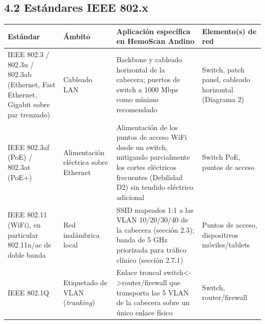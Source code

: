 \documentclass[11pt,a4paper]{article}
\begin{document}
\subsection{4.2 Estándares IEEE 802.x}\label{estuxe1ndares-ieee-802.x}

{\small
\begin{longtable}[]{@{}
  >{\raggedright\arraybackslash}p{}
  >{\raggedright\arraybackslash}p{}
  >{\raggedright\arraybackslash}p{}
  >{\raggedright\arraybackslash}p{}@{}}
\toprule\noalign{}
\begin{minipage}[b]{\linewidth}\raggedright
Estándar
\end{minipage} & \begin{minipage}[b]{\linewidth}\raggedright
Ámbito
\end{minipage} & \begin{minipage}[b]{\linewidth}\raggedright
Aplicación específica en HemoScan Andino
\end{minipage} & \begin{minipage}[b]{\linewidth}\raggedright
Elemento(s) de red
\end{minipage} \\
\midrule\noalign{}
\endhead
\bottomrule\noalign{}
\endlastfoot
IEEE 802.3 / 802.3u / 802.3ab (Ethernet, Fast Ethernet, Gigabit sobre par trenzado) & Cableado LAN & Backbone y cableado horizontal de la cabecera; puertos de switch a 1000 Mbps como mínimo recomendado & Switch, patch panel, cableado horizontal (Diagrama 2) \\
IEEE 802.3af (PoE) / 802.3at (PoE+) & Alimentación eléctrica sobre Ethernet & Alimentación de los puntos de acceso WiFi desde un switch, mitigando parcialmente los cortes eléctricos frecuentes (Debilidad D2) sin tendido eléctrico adicional & Switch PoE, puntos de acceso \\
IEEE 802.11 (WiFi), en particular 802.11n/ac de doble banda & Red inalámbrica local & SSID mapeados 1:1 a las VLAN 10/20/30/40 de la cabecera (sección 2.3); banda de 5 GHz priorizada para tráfico clínico (sección 2.7.1) & Puntos de acceso, dispositivos móviles/tablets \\
IEEE 802.1Q & Etiquetado de VLAN (\emph{trunking}) & Enlace troncal switch\textless-\textgreater router/firewall que transporta las 5 VLAN de la cabecera sobre un único enlace físico & Switch, router/firewall \\

\end{longtable}}
\end{document}
